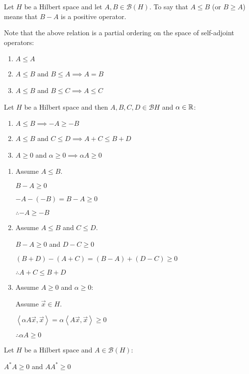 \documentclass[letterpaper,12pt,fleqn]{article}
\newcommand{\mb}{\mathcal{B}}
\newcommand{\inner}[1]{\left<#1\right>}
\newcommand{\vx}{\vec{x}}
\renewcommand{\a}{\alpha}
\begin{document}
\begin{definition}
  Let $H$ be a Hilbert space and let $A,B\in\mb(H)$. To say that $A\le B$
  (or $B\ge A$) means that $B-A$ is a positive operator.

  Note that the above relation is a partial ordering on the space of
  self-adjoint operators:
  \begin{enumerate}
  \item $A\le A$
  \item $A\le B$ and $B\le A\implies A=B$
  \item $A\le B$ and $B\le C\implies A\le C$
  \end{enumerate}
\end{definition}

\begin{properties}
  Let $H$ be a Hilbert space and then $A,B,C,D\in\mb H$ and $\a\in\R$:
  \begin{enumerate}
  \item $A\le B\implies -A\ge-B$
  \item $A\le B$ and $C\le D\implies A+C\le B+D$
  \item $A\ge0$ and $\a\ge0\implies\a A\ge0$
  \end{enumerate}
\end{properties}

\begin{theproof}
  \listbreak
  \begin{enumerate}
  \item Assume $A\le B$.

    $B-A\ge0$

    $-A-(-B)=B-A\ge0$
    
    $\therefore -A\ge-B$

  \item Assume $A\le B$ and $C\le D$.

    $B-A\ge0$ and $D-C\ge0$

    $(B+D)-(A+C)=(B-A)+(D-C)\ge0$

    $\therefore A+C\le B+D$

  \item Assume $A\ge0$ and $\a\ge0$:

    Assume $\vx\in H$.
    
    $\inner{\a A\vx,\vx}=\a\inner{A\vx,\vx}\ge0$

    $\therefore\a A\ge0$
  \end{enumerate}
\end{theproof}

\begin{theorem}
  Let $H$ be a Hilbert space and $A\in\mb(H)$:

  \qquad$A^*A\ge0$ and $AA^*\ge0$
\end{theorem}
\end{document}
